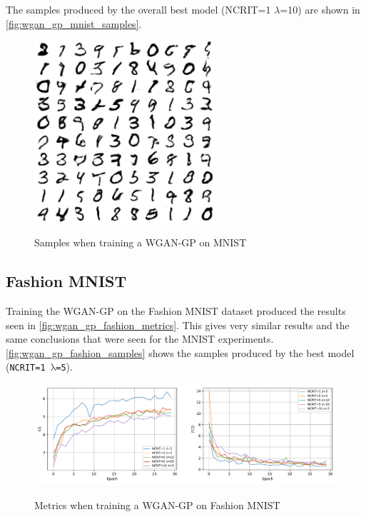 The samples produced by the overall best model (NCRIT=1  $\lambda$=10) are shown in \autoref{fig:wgan_gp_mnist_samples}.
\begin{figure}
    \centering
    \caption{Samples when training a WGAN-GP on MNIST}
    \includegraphics[width=0.6\textwidth]{chapters/Experiments/WGAN-GP/mnist_samples.png}
    \label{fig:wgan_gp_mnist_samples}
\end{figure}


\subsection{Fashion MNIST}
Training the \gls{WGAN-GP} on the Fashion MNIST dataset produced the results seen in \autoref{fig:wgan_gp_fashion_metrics}. This gives very similar results and the same conclusions that were seen for the \gls{MNIST} experiments. \autoref{fig:wgan_gp_fashion_samples} shows the samples produced by the best model (\texttt{NCRIT=1 $\mathrm{\lambda}$=5}).
\begin{figure}[hbt]
    \centering
    \caption{Metrics when training a WGAN-GP on Fashion MNIST}
    \includegraphics[width=\textwidth]{chapters/Experiments/WGAN-GP/fashion_metrics.pdf}
    \label{fig:wgan_gp_fashion_metrics}
\end{figure}

